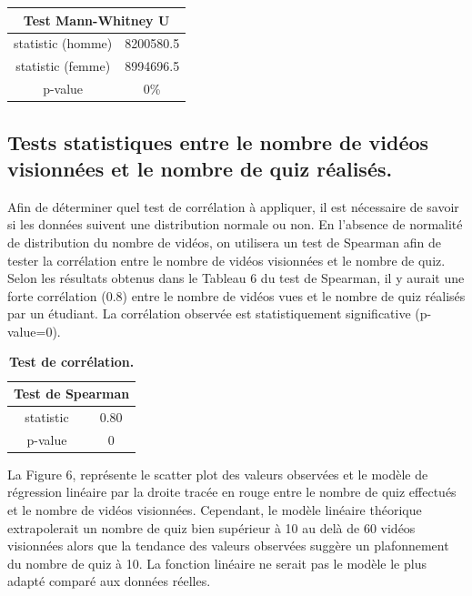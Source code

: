 \documentclass[12pt, a4paper, titlepage, table]{article}
\begin{document}
\begin{table}[H]
	\centering
	\fontsize{12}{20}\selectfont
	\begin{tabular}{|c|c|}
		\hline
		\multicolumn{2}{|c|}{\textbf{Test Mann-Whitney U}}\\ 
		\hline 
		statistic (homme)& 8200580.5\\
		statistic (femme)& 8994696.5\\
		p-value& 0\%\\
		\hline
	\end{tabular}
\end{table}

\subsection{Tests statistiques entre le nombre de vidéos visionnées et le nombre de quiz réalisés.}
Afin de déterminer quel test de corrélation à appliquer, il est nécessaire de savoir si les données suivent une distribution normale ou non. 
En l'absence de normalité de distribution du nombre de vidéos, on utilisera un test de Spearman afin de tester la corrélation entre le nombre de vidéos 
visionnées et le nombre de quiz. 
Selon les résultats obtenus dans le Tableau 6 du test de Spearman, il y aurait une forte corrélation (0.8) entre le nombre de vidéos vues et le nombre 
de quiz réalisés par un étudiant. 
La corrélation observée est statistiquement significative (p-value=0).
\begin{table}[H]
	\centering
	\fontsize{12}{20}\selectfont
	\begin{tabular}{|c|c|}
		\hline
		\multicolumn{2}{|c|}{\textbf{Test de Spearman}}\\ 
		\hline 
		statistic& 0.80\\
		p-value& 0\\
		\hline
	\end{tabular}
	\caption{\textbf{Test de corrélation.}}
\end{table}

La Figure 6, représente le scatter plot des valeurs observées et le modèle de régression linéaire par la droite tracée en rouge entre le nombre de quiz
effectués et le nombre de vidéos visionnées. Cependant, le modèle linéaire théorique extrapolerait un nombre de quiz bien supérieur à 10 au delà de 60 vidéos 
visionnées alors que la tendance des valeurs observées suggère un plafonnement du nombre de quiz à 10. 
La fonction linéaire ne serait pas le modèle le plus adapté comparé aux données réelles.
\end{document}
